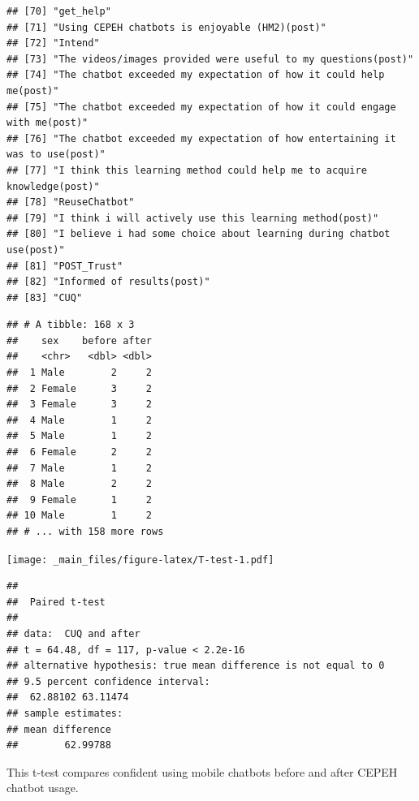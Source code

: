 \documentclass[a4paper, nobind]{templates/ociamthesis}
\begin{document}
\begin{verbatim}
## [70] "get_help"                                                                                       
## [71] "Using CEPEH chatbots is enjoyable (HM2)(post)"                                                  
## [72] "Intend"                                                                                         
## [73] "The videos/images provided were useful to my questions(post)"                                   
## [74] "The chatbot exceeded my expectation of how it could help me(post)"                              
## [75] "The chatbot exceeded my expectation of how it could engage with me(post)"                       
## [76] "The chatbot exceeded my expectation of how entertaining it was to use(post)"                    
## [77] "I think this learning method could help me to acquire knowledge(post)"                          
## [78] "ReuseChatbot"                                                                                   
## [79] "I think i will actively use this learning method(post)"                                         
## [80] "I believe i had some choice about learning during chatbot use(post)"                            
## [81] "POST_Trust"                                                                                     
## [82] "Informed of results(post)"                                                                      
## [83] "CUQ"
\end{verbatim}

\begin{verbatim}
## # A tibble: 168 x 3
##    sex    before after
##    <chr>   <dbl> <dbl>
##  1 Male        2     2
##  2 Female      3     2
##  3 Female      3     2
##  4 Male        1     2
##  5 Male        1     2
##  6 Female      2     2
##  7 Male        1     2
##  8 Male        2     2
##  9 Female      1     2
## 10 Male        1     2
## # ... with 158 more rows
\end{verbatim}

\texttt{[image: \_main\_files/figure-latex/T-test-1.pdf]}

\begin{verbatim}
## 
##  Paired t-test
## 
## data:  CUQ and after
## t = 64.48, df = 117, p-value < 2.2e-16
## alternative hypothesis: true mean difference is not equal to 0
## 9.5 percent confidence interval:
##  62.88102 63.11474
## sample estimates:
## mean difference 
##        62.99788
\end{verbatim}

This t-test compares confident using mobile chatbots before and after CEPEH chatbot usage.
\end{document}
